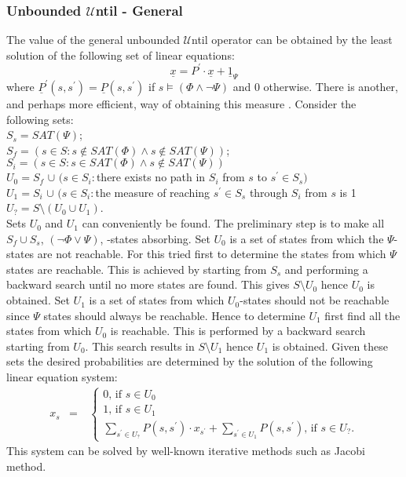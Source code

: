 \documentclass[a4paper,10pt]{article}
\begin{document}
	\subsubsection{Unbounded $\mathcal{U}$ntil - General}
	The value of the general unbounded $\mathcal{U}$ntil operator can be obtained by the least solution of the following set of linear equations:
	\begin{equation*}\underline{x} = P^{\prime} \cdot \underline{x} + \underline{1}_{\Psi}\end{equation*}
	where $\underline{P}^{\prime}(s,s^{\prime})=\underline{P}(s,s^{\prime})$ if $s\vDash(\Phi\wedge\lnot\Psi)$ and 0 otherwise.
	There is another, and perhaps more efficient, way of obtaining this measure \cite{ciesinski1}. Consider the following sets:\\
	$S_{s}=SAT(\Psi)$;\\
	$S_{f}=(s\in S:s\notin SAT(\Phi) \wedge s\notin SAT(\Psi))$;\\
	$S_{i}=(s\in S:s\in SAT(\Phi)\wedge s\notin SAT(\Psi))$\\
	$U_{0} = S_{f}$ $\cup$ $(s\in S_{i}:$there exists no path in $S_{i}$ from $s$ to $s^{\prime} \in S_{s})$\\
	$U_{1} = S_{i}$ $\cup$ $(s\in S_{i}:$the measure of reaching $s^{\prime}\in S_{s}$ through $S_{i}$ from $s$ is 1\\
	$U_{?} = S\setminus(U_{0}\cup U_{1})$.\\
	Sets $U_{0}$ and $U_{1}$ can conveniently be found. The preliminary step is to make all $S_{f}\cup S_{s}$, $(\lnot\Phi\vee\Psi)$, -states absorbing. Set $U_{0}$ is a set of states from which the $\Psi$-states are not reachable. For this tried first to determine the states from which $\Psi$ states are reachable. This is achieved by starting from $S_{s}$ and performing a backward search until no more states are found. This gives $S\setminus U_{0}$ hence $U_{0}$ is obtained. Set $U_{1}$ is a set of states from which $U_{0}$-states should not be reachable since $\Psi$ states should always be reachable. Hence to determine $U_{1}$ first find all the states from which $U_{0}$ is reachable. This is performed by a backward search starting from $U_{0}$. This search results in $S\setminus U_{1}$ hence $U_{1}$ is obtained. Given these sets the desired probabilities are determined by the solution of the following linear equation system:
	\begin{eqnarray*}
	x_{s}
	&=&\ \left\{
	\begin{array}{l}
	0 \text{, if } s\in U_{0}\\
	1 \text{, if } s\in U_{1}\\
	\sum\limits_{s^{\prime}\in U_{?}}P(s,s^{\prime})\cdot x_{s^{\prime}}+\sum\limits_{s^{\prime}\in U_{1}}P(s,s^{\prime}) \text{, if } s\in U_{?} \text{.}
	\end{array}
	\right.
	\end{eqnarray*}
	This system can be solved by well-known iterative methods such as Jacobi method.
\end{document}
